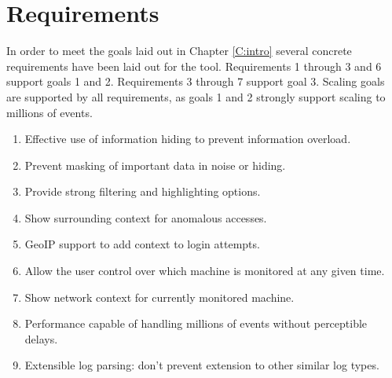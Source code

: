 \section{Requirements}

In order to meet the goals laid out in Chapter \ref{C:intro} several concrete requirements have been laid out for the tool.  Requirements 1 through 3 and 6 support goals 1 and 2.
Requirements 3 through 7 support goal 3. Scaling goals are supported by all requirements, as goals 1 and 2 strongly support scaling to millions of events.  

\begin{enumerate}
\item{Effective use of information hiding to prevent information overload.}
\item{Prevent masking of important data in noise or hiding.}
\item{Provide strong filtering and highlighting options.}
\item{Show surrounding context for anomalous accesses.}
\item{GeoIP support to add context to login attempts.}
\item{Allow the user control over which machine is monitored at any given time.}
\item{Show network context for currently monitored machine.}
\item{Performance capable of handling millions of events without perceptible delays.}
\item{Extensible log parsing: don't prevent extension to other similar log types.}
\end{enumerate}